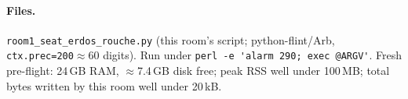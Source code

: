 \documentclass[11pt]{article}
\begin{document}
\paragraph{Files.} \texttt{room1\_seat\_erdos\_rouche.py} (this room's script; python-flint/Arb, \texttt{ctx.prec=200}$\approx$60 digits). Run under \verb|perl -e 'alarm 290; exec @ARGV'|. Fresh pre-flight: 24\,GB RAM, $\approx$7.4\,GB disk free; peak RSS well under 100\,MB; total bytes written by this room well under 20\,kB.
\end{document}
